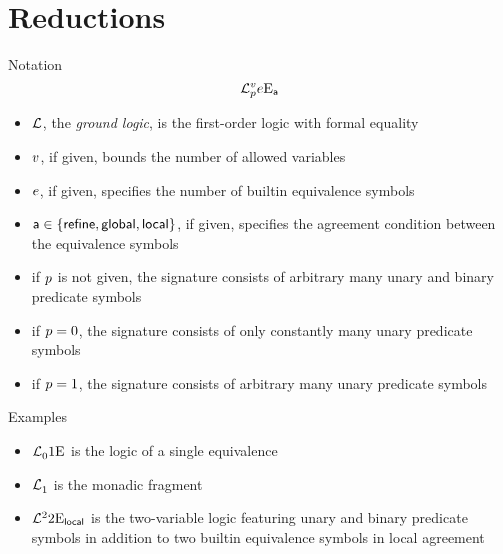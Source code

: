 \documentclass{beamer}
\begin{document}
\section{Reductions}
\begin{frame}{Notation}
\[
  \mathcal{L}^{v}_{p}{e}\mathrm{E}_{\mathsf{a}}
\]
\begin{itemize}
  \item
  $\mathcal{L}$, the \emph{ground logic}, is the first-order logic with formal equality
  
  \item
  $v$, if given, bounds the number of allowed variables
  
  \item
  $e$, if given, specifies the number of builtin equivalence symbols
  
  \item
  $\mathsf{a}\in\left\{\mathsf{refine},\mathsf{global},\mathsf{local}\right\}$, if given, specifies the agreement
  condition between the equivalence symbols
  
  \item
  if $p$ is not given, the signature consists of arbitrary many unary and
  binary predicate symbols
  
  \item
  if $p = 0$, the signature consists of only constantly many unary predicate
  symbols
  
  \item
  if $p = 1$, the signature consists of arbitrary many unary predicate
  symbols
\end{itemize}
\end{frame}

\begin{frame}{Examples}
\begin{itemize}
  \item
  $\mathcal{L}^{{}}_{0}{1}\mathrm{E}_{{}}$ is the logic of a single equivalence
  
  \item
  $\mathcal{L}^{{}}_{1}$ is the monadic fragment
  
  \item
  $\mathcal{L}^{2}_{{}}{2}\mathrm{E}_{\mathsf{local}}$ is the two-variable logic featuring unary and
  binary predicate symbols in addition to two builtin equivalence symbols in
  local agreement
\end{itemize}
\end{frame}
\end{document}
